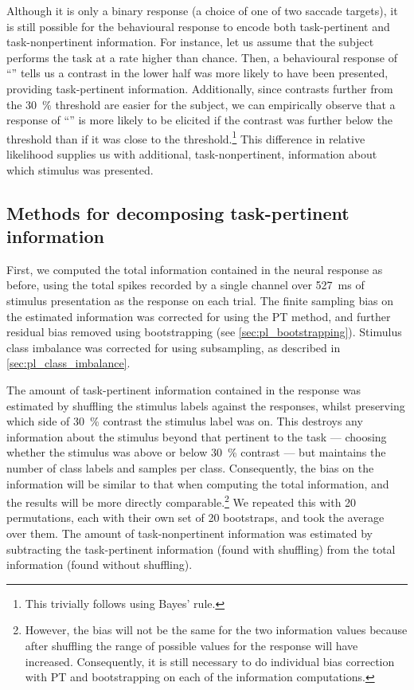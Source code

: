 Although it is only a binary response (a choice of one of two saccade targets), it is still possible for the behavioural response to encode both task-pertinent and task-nonpertinent information.
For instance, let us assume that the subject performs the task at a rate higher than chance.
Then, a behavioural response of ``'' tells us a contrast in the lower half was more likely to have been presented, providing task-pertinent information.
Additionally, since contrasts further from the \SI{30}{\percent} threshold are easier for the subject, we can empirically observe that a response of ``'' is more likely to be elicited if the contrast was further below the threshold than if it was close to the threshold.\footnote{This trivially follows using Bayes' rule.}
This difference in relative likelihood supplies us with additional, task-nonpertinent, information about which stimulus was presented.


\subsection{Methods for decomposing task-pertinent information}
\label{sec:task-info-methods}

First, we computed the total information contained in the neural response as before, using the total spikes recorded by a single channel over \SI{527}{\milli\second} of stimulus presentation as the response on each trial.
The finite sampling bias on the estimated information was corrected for using the \ac{PT} method, and further residual bias removed using bootstrapping (see \autoref{sec:pl_bootstrapping}).
Stimulus class imbalance was corrected for using subsampling, as described in \autoref{sec:pl_class_imbalance}.

The amount of task-pertinent information contained in the response was estimated by shuffling the stimulus labels against the responses, whilst preserving which side of \SI{30}{\percent} contrast the stimulus label was on.
This destroys any information about the stimulus beyond that pertinent to the task --- choosing whether the stimulus was above or below \SI{30}{\percent} contrast --- but maintains the number of class labels and samples per class.
Consequently, the bias on the information will be similar to that when computing the total information, and the results will be more directly comparable.\footnote{However, the bias will not be the same for the two information values because after shuffling the range of possible values for the response will have increased. Consequently, it is still necessary to do individual bias correction with \ac{PT} and bootstrapping on each of the information computations.}
We repeated this with \num{20} permutations, each with their own set of \num{20} bootstraps, and took the average over them.
The amount of task-nonpertinent information was estimated by subtracting the task-pertinent information (found with shuffling) from the total information (found without shuffling).

